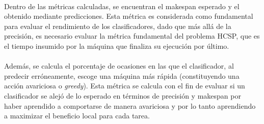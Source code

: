 \paragraph{} Dentro de las métricas calculadas, se encuentran el makespan esperado y el obtenido mediante predicciones. Esta métrica es considerada como fundamental para evaluar el rendimiento de los clasificadores, dado que más allá de la precisión, es necesario evaluar la métrica fundamental del problema HCSP, que es el tiempo insumido por la máquina que finaliza su ejecución por último.

\paragraph{} Además, se calcula el porcentaje de ocasiones en las que el clasificador, al predecir erróneamente, escoge una máquina más rápida (constituyendo una acción avariciosa o \textit{greedy}). Esta métrica se calcula con el fin de evaluar si un clasificador se alejó de lo esperado en términos de precisión y makespan por haber aprendido a comportarse de manera avariciosa y por lo tanto aprendiendo a maximizar el beneficio local para cada tarea.
